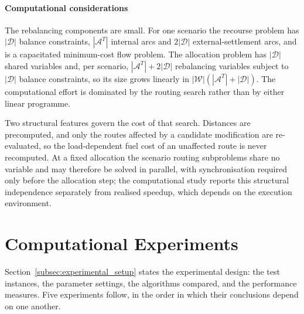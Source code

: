 \documentclass[authoryear,final,3p,times]{elsarticle}
\theoremstyle{definition}
\theoremstyle{plain}
\begin{document}
\paragraph{Computational considerations}

The rebalancing components are small. For one scenario the recourse problem
has $|\mathcal D|$ balance constraints, $|\mathcal A^T|$ internal arcs and
$2|\mathcal D|$ external-settlement arcs, and is a capacitated minimum-cost flow problem.
The allocation problem has $|\mathcal D|$ shared variables and, per scenario,
$|\mathcal A^T|+2|\mathcal D|$ rebalancing variables subject to
$|\mathcal D|$ balance constraints, so its size grows linearly in
$|\mathcal W|(|\mathcal A^T|+|\mathcal D|)$. The computational effort is
dominated by the routing search rather than by either linear programme.

Two structural features govern the cost of that search. Distances are
precomputed, and only the routes affected by a candidate modification are
re-evaluated, so the load-dependent fuel cost of an unaffected route is never
recomputed. At a fixed allocation the scenario routing subproblems share no
variable and may therefore be solved in parallel, with synchronisation
required only before the allocation step; the computational study reports this
structural independence separately from realised speedup, which depends on
the execution environment.

\section{Computational Experiments}
\label{sec:computational_experiments}

Section~\ref{subsec:experimental_setup} states the experimental design: the
test instances, the parameter settings, the algorithms compared, and the
performance measures.  Five experiments follow, in the order in which their
conclusions depend on one another.
\end{document}
